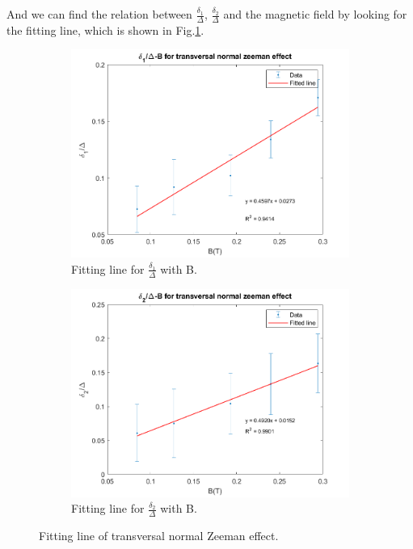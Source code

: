 \documentclass[a4paper,12pt]{article}
\begin{document}
    \par And we can find the relation between $\frac{\delta_{1}}{\Delta}$, $\frac{\delta_{2}}{\Delta}$ and the magnetic field by looking for the fitting line, which is shown in Fig.\ref{fig:tra_nor_data}.
    
    \begin{figure}[H]
        \centering
        \begin{subfigure}[b]{0.48\textwidth}
            \includegraphics[width=\textwidth]{tra_nor_d1_data.png}
            \caption{Fitting line for $\frac{\delta_{1}}{\Delta}$ with B.}
        \end{subfigure}
        \begin{subfigure}[b]{0.48\textwidth}
            \includegraphics[width=\textwidth]{tra_nor_d2_data.png}
            \caption{Fitting line for $\frac{\delta_{2}}{\Delta}$ with B.}
        \end{subfigure}
        \caption{Fitting line of transversal normal Zeeman effect.}
        \label{fig:tra_nor_data}
    \end{figure}
    
\end{document}

